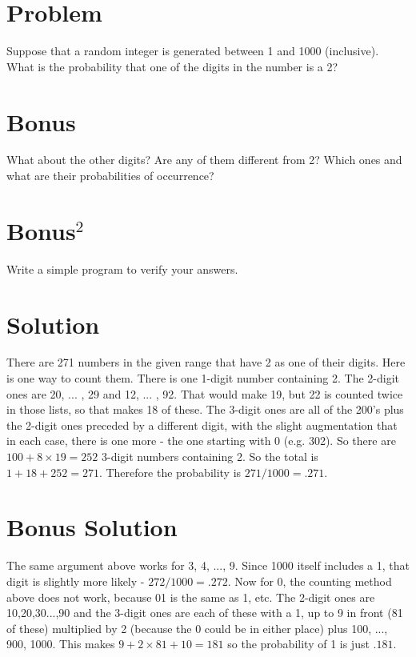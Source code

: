 \documentclass[11pt,a4paper]{report}
\theoremstyle{plain}
\theoremstyle{definition}
\theoremstyle{remark}
\begin{document}
\section*{Problem}
Suppose that a random integer is generated between 1 and 1000 (inclusive).  What is the probability that one of the digits in the number is a 2? 

\section*{Bonus}
What about the other digits?  Are any of them different from 2?  Which ones and what are their probabilities of occurrence?

\section*{Bonus$^2$}
Write a simple program to verify your answers.

\newpage
\section*{Solution}
There are 271 numbers in the given range that have 2 as one of their digits.  Here is one way to count them.  There is one 1-digit number containing 2.  The 2-digit ones are 20, ... , 29 and 12, ... , 92.  That would make 19, but 22 is counted twice in those lists, so that makes 18 of these.  The 3-digit ones are all of the 200's plus the 2-digit ones preceded by a different digit, with the slight augmentation that in each case, there is one more - the one starting with 0 (e.g. 302).  So there are $100 + 8 \times 19 = 252$ 3-digit numbers containing 2.  So the total is $1 + 18 + 252 = 271.$
Therefore the probability is $271 / 1000 = .271$.
\section*{Bonus Solution}
The same argument above works for 3, 4, ..., 9.  Since 1000 itself includes a 1, that digit is slightly more likely - $272/1000 = .272.$  Now for 0, the counting method above does not work, because 01 is the same as 1, etc.  The 2-digit ones are 10,20,30...,90 and the 3-digit ones are each of these with a 1, up to 9 in front (81 of these) multiplied by 2 (because the 0 could be in either place) plus 100, ..., 900, 1000.  This makes $9 + 2 \times 81 + 10 = 181$ so the probability of 1 is just $.181.$

\pagebreak
\end{document}
